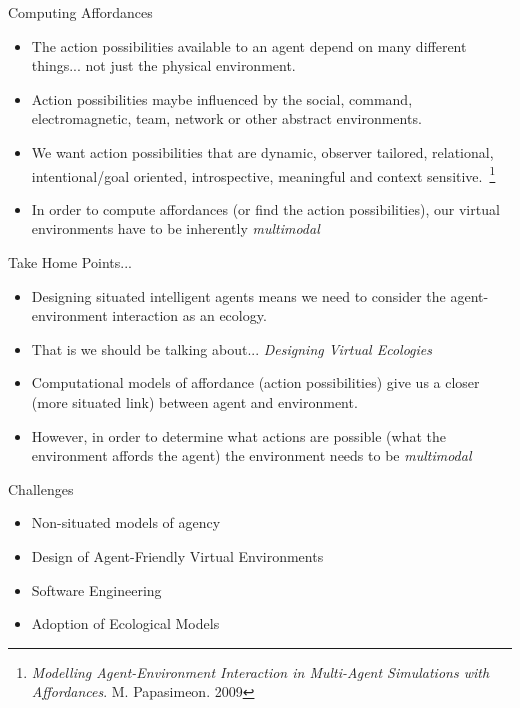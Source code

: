 \documentclass[xcolor=dvipsnames,t]{beamer}
\begin{document}
\begin{frame}{Computing Affordances} 
    \begin{itemize} 
        \item The action possibilities available to an agent depend on many
            different things... not just the physical environment. 
        \item Action possibilities maybe influenced by the social, command,
            electromagnetic, team, network or other abstract environments. 
        \item We want action possibilities that are dynamic, observer
            tailored, relational, intentional/goal oriented, introspective,
            meaningful and context sensitive.~\footnote{\emph{Modelling
                Agent-Environment Interaction in Multi-Agent Simulations with
            Affordances}.  M.  Papasimeon. 2009}
        \item In order to compute affordances (or find the action
            possibilities), our virtual environments have to be
            inherently \emph{multimodal} 
    \end{itemize} 
\end{frame} 

\begin{frame}{Take Home Points...} 
    \begin{itemize} 
        \item Designing situated intelligent agents means we need to consider the 
          agent-environment interaction as an ecology. 
        \item That is we should be talking about... \emph{Designing Virtual Ecologies}
        \item Computational models of affordance (action possibilities) give us a
          closer (more situated link) between agent and environment.
        \item However, in order to determine what actions are possible (what the
          environment affords the agent) the environment needs to be
          \emph{multimodal} 
\end{itemize} 

    \begin{alertblock}{Challenges}
        \begin{itemize}
            \item Non-situated models of agency
            \item Design of Agent-Friendly Virtual Environments
            \item Software Engineering 
            \item Adoption of Ecological Models
        \end{itemize} 
    \end{alertblock} 
\end{frame} 
\end{document}
